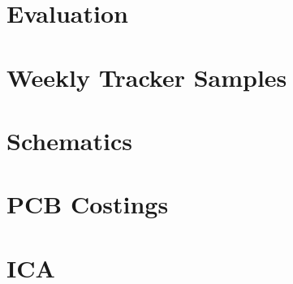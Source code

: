 \documentclass[a4paper, 12pt]{report}
\begin{document}




\chapter{Evaluation}








\appendix
\chapter{Weekly Tracker Samples}

\chapter{Schematics}

\chapter{PCB Costings}

\chapter{ICA}

\end{document}
